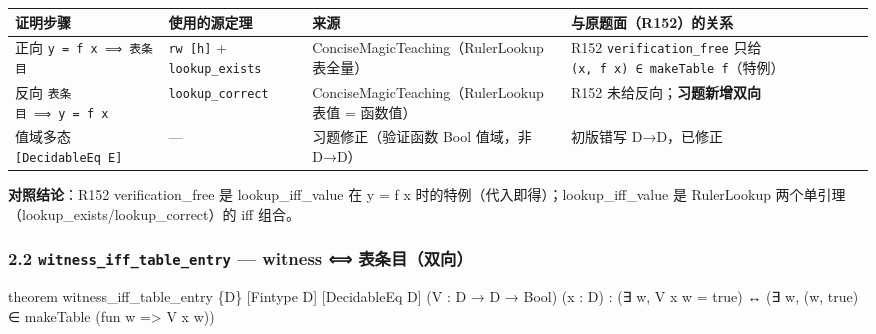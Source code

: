 \documentclass[
]{article}
\newenvironment{Shaded}{}{}
\newcommand{\NormalTok}[1]{#1}
\newcounter{none} %
\begin{document}
{\def\LTcaptype{none} %
\begin{longtable}[]{@{}
  >{\raggedright\arraybackslash}p{}
  >{\raggedright\arraybackslash}p{}
  >{\raggedright\arraybackslash}p{}
  >{\raggedright\arraybackslash}p{}@{}}
\toprule\noalign{}
\begin{minipage}[b]{\linewidth}\raggedright
证明步骤
\end{minipage} & \begin{minipage}[b]{\linewidth}\raggedright
使用的源定理
\end{minipage} & \begin{minipage}[b]{\linewidth}\raggedright
来源
\end{minipage} & \begin{minipage}[b]{\linewidth}\raggedright
与原题面（R152）的关系
\end{minipage} \\
\midrule\noalign{}
\endhead
\bottomrule\noalign{}
\endlastfoot
正向 \texttt{y\ =\ f\ x\ ⟹\ 表条目} & \texttt{rw\ {[}h{]}} +
\texttt{lookup\_exists} & ConciseMagicTeaching（RulerLookup 表全量） &
R152 \texttt{verification\_free} 只给
\texttt{(x,\ f\ x)\ ∈\ makeTable\ f}（特例） \\
反向 \texttt{表条目\ ⟹\ y\ =\ f\ x} & \texttt{lookup\_correct} &
ConciseMagicTeaching（RulerLookup 表值 = 函数值） & R152
未给反向；\textbf{习题新增双向} \\
值域多态 \texttt{{[}DecidableEq\ E{]}} & --- & 习题修正（验证函数 Bool
值域，非 D→D） & 初版错写 D→D，已修正 \\
\end{longtable}
}

\textbf{对照结论}：R152 verification\_free 是 lookup\_iff\_value 在 y =
f x 时的特例（代入即得）；lookup\_iff\_value 是 RulerLookup
两个单引理（lookup\_exists/lookup\_correct）的 iff 组合。

\subsubsection{\texorpdfstring{2.2 \texttt{witness\_iff\_table\_entry}
--- witness ⟺
表条目（双向）}{2.2 witness\_iff\_table\_entry --- witness ⟺ 表条目（双向）}}\label{witness_iff_table_entry-witness-ux8868ux6761ux76eeux53ccux5411}

\begin{Shaded}
\begin{Highlighting}[]
\NormalTok{theorem witness\_iff\_table\_entry \{D\} [Fintype D] [DecidableEq D]}
\NormalTok{    (V : D → D → Bool) (x : D) :}
\NormalTok{    (∃ w, V x w = true) ↔ (∃ w, (w, true) ∈ makeTable (fun w =\textgreater{} V x w))}
\end{Highlighting}
\end{Shaded}
\end{document}
